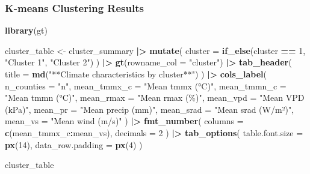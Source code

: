\documentclass[
]{article}
\newenvironment{Shaded}{\begin{snugshade}}{\end{snugshade}}
\newcommand{\AttributeTok}[1]{\textcolor[rgb]{0.13,0.29,0.53}{#1}}
\newcommand{\DecValTok}[1]{\textcolor[rgb]{0.00,0.00,0.81}{#1}}
\newcommand{\FunctionTok}[1]{\textcolor[rgb]{0.13,0.29,0.53}{\textbf{#1}}}
\newcommand{\NormalTok}[1]{#1}
\newcommand{\OtherTok}[1]{\textcolor[rgb]{0.56,0.35,0.01}{#1}}
\newcommand{\SpecialCharTok}[1]{\textcolor[rgb]{0.81,0.36,0.00}{\textbf{#1}}}
\newcommand{\StringTok}[1]{\textcolor[rgb]{0.31,0.60,0.02}{#1}}
\begin{document}
\subsubsection{K-means Clustering
Results}\label{k-means-clustering-results}

\begin{Shaded}
\begin{Highlighting}[]
\FunctionTok{library}\NormalTok{(gt)}

\NormalTok{cluster\_table }\OtherTok{\textless{}{-}}\NormalTok{ cluster\_summary }\SpecialCharTok{|\textgreater{}}
  \FunctionTok{mutate}\NormalTok{(}
    \AttributeTok{cluster =} \FunctionTok{if\_else}\NormalTok{(cluster }\SpecialCharTok{==} \DecValTok{1}\NormalTok{, }\StringTok{"Cluster 1"}\NormalTok{, }\StringTok{"Cluster 2"}\NormalTok{)}
\NormalTok{  ) }\SpecialCharTok{|\textgreater{}}
  \FunctionTok{gt}\NormalTok{(}\AttributeTok{rowname\_col =} \StringTok{"cluster"}\NormalTok{) }\SpecialCharTok{|\textgreater{}}
  \FunctionTok{tab\_header}\NormalTok{(}
    \AttributeTok{title =} \FunctionTok{md}\NormalTok{(}\StringTok{"**Climate characteristics by cluster**"}\NormalTok{)}
\NormalTok{  ) }\SpecialCharTok{|\textgreater{}}
  \FunctionTok{cols\_label}\NormalTok{(}
    \AttributeTok{n\_counties  =} \StringTok{"n"}\NormalTok{,}
    \AttributeTok{mean\_tmmx\_c =} \StringTok{"Mean tmmx (°C)"}\NormalTok{,}
    \AttributeTok{mean\_tmmn\_c =} \StringTok{"Mean tmmn (°C)"}\NormalTok{,}
    \AttributeTok{mean\_rmax   =} \StringTok{"Mean rmax (\%)"}\NormalTok{,}
    \AttributeTok{mean\_vpd    =} \StringTok{"Mean VPD (kPa)"}\NormalTok{,}
    \AttributeTok{mean\_pr     =} \StringTok{"Mean precip (mm)"}\NormalTok{,}
    \AttributeTok{mean\_srad   =} \StringTok{"Mean srad (W/m²)"}\NormalTok{,}
    \AttributeTok{mean\_vs     =} \StringTok{"Mean wind (m/s)"}
\NormalTok{  ) }\SpecialCharTok{|\textgreater{}}
  \FunctionTok{fmt\_number}\NormalTok{(}
    \AttributeTok{columns =} \FunctionTok{c}\NormalTok{(mean\_tmmx\_c}\SpecialCharTok{:}\NormalTok{mean\_vs),}
    \AttributeTok{decimals =} \DecValTok{2}
\NormalTok{  ) }\SpecialCharTok{|\textgreater{}}
  \FunctionTok{tab\_options}\NormalTok{(}
    \AttributeTok{table.font.size =} \FunctionTok{px}\NormalTok{(}\DecValTok{14}\NormalTok{),}
    \AttributeTok{data\_row.padding =} \FunctionTok{px}\NormalTok{(}\DecValTok{4}\NormalTok{)}
\NormalTok{  )}

\NormalTok{cluster\_table}
\end{Highlighting}
\end{Shaded}
\end{document}
